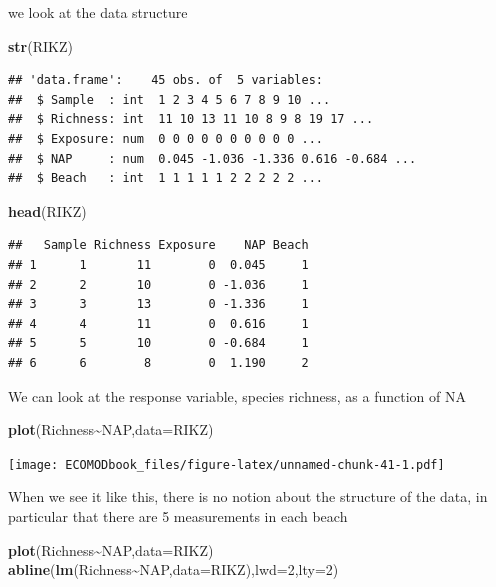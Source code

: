 \documentclass[
]{book}
\newenvironment{Shaded}{\begin{snugshade}}{\end{snugshade}}
\newcommand{\AttributeTok}[1]{\textcolor[rgb]{0.13,0.29,0.53}{#1}}
\newcommand{\DecValTok}[1]{\textcolor[rgb]{0.00,0.00,0.81}{#1}}
\newcommand{\FunctionTok}[1]{\textcolor[rgb]{0.13,0.29,0.53}{\textbf{#1}}}
\newcommand{\NormalTok}[1]{#1}
\newcommand{\SpecialCharTok}[1]{\textcolor[rgb]{0.81,0.36,0.00}{\textbf{#1}}}
\begin{document}
we look at the data structure

\begin{Shaded}
\begin{Highlighting}[]
\FunctionTok{str}\NormalTok{(RIKZ)}
\end{Highlighting}
\end{Shaded}

\begin{verbatim}
## 'data.frame':    45 obs. of  5 variables:
##  $ Sample  : int  1 2 3 4 5 6 7 8 9 10 ...
##  $ Richness: int  11 10 13 11 10 8 9 8 19 17 ...
##  $ Exposure: num  0 0 0 0 0 0 0 0 0 0 ...
##  $ NAP     : num  0.045 -1.036 -1.336 0.616 -0.684 ...
##  $ Beach   : int  1 1 1 1 1 2 2 2 2 2 ...
\end{verbatim}

\begin{Shaded}
\begin{Highlighting}[]
\FunctionTok{head}\NormalTok{(RIKZ)}
\end{Highlighting}
\end{Shaded}

\begin{verbatim}
##   Sample Richness Exposure    NAP Beach
## 1      1       11        0  0.045     1
## 2      2       10        0 -1.036     1
## 3      3       13        0 -1.336     1
## 4      4       11        0  0.616     1
## 5      5       10        0 -0.684     1
## 6      6        8        0  1.190     2
\end{verbatim}

We can look at the response variable, species richness, as a function of NA

\begin{Shaded}
\begin{Highlighting}[]
\FunctionTok{plot}\NormalTok{(Richness}\SpecialCharTok{\textasciitilde{}}\NormalTok{NAP,}\AttributeTok{data=}\NormalTok{RIKZ)}
\end{Highlighting}
\end{Shaded}

\texttt{[image: ECOMODbook\_files/figure-latex/unnamed-chunk-41-1.pdf]}

When we see it like this, there is no notion about the structure of the data, in particular that there are 5 measurements in each beach

\begin{Shaded}
\begin{Highlighting}[]
\FunctionTok{plot}\NormalTok{(Richness}\SpecialCharTok{\textasciitilde{}}\NormalTok{NAP,}\AttributeTok{data=}\NormalTok{RIKZ)}
\FunctionTok{abline}\NormalTok{(}\FunctionTok{lm}\NormalTok{(Richness}\SpecialCharTok{\textasciitilde{}}\NormalTok{NAP,}\AttributeTok{data=}\NormalTok{RIKZ),}\AttributeTok{lwd=}\DecValTok{2}\NormalTok{,}\AttributeTok{lty=}\DecValTok{2}\NormalTok{)}
\end{Highlighting}
\end{Shaded}
\end{document}
